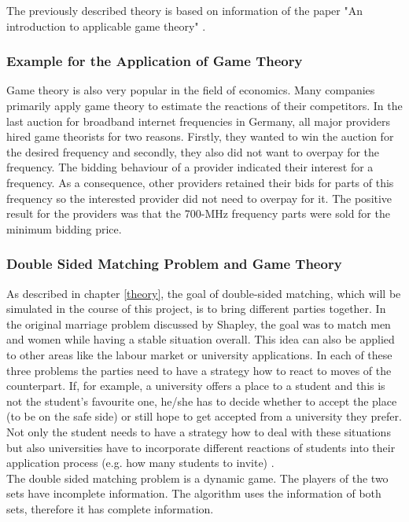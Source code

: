 The previously described theory is based on information of the paper "An introduction to applicable game theory" \cite {gibbons1997gametheory}.

\subsubsection{Example for the Application of Game Theory}
Game theory is also very popular in the field of economics.
Many companies primarily apply game theory to estimate the reactions of their competitors. 
In the last auction for broadband internet frequencies in Germany, all major providers hired game theorists for two reasons. 
Firstly, they wanted to win the auction for the desired frequency and secondly, they also did not want to overpay for the frequency.
The bidding behaviour of a provider indicated their interest for a frequency. 
As a consequence, other providers retained their bids for parts of this frequency so the interested provider did not need to overpay for it. 
The positive result for the providers was that the 700-MHz frequency parts were sold for the minimum bidding price. \cite{gametheoryWelt}

\subsubsection{Double Sided Matching Problem and Game Theory}

As described in chapter \ref{theory}, the goal of double-sided matching, which will be simulated in the course of this project, is to bring different parties together.
In the original marriage problem discussed by Shapley, the goal was to match men and women while having a stable situation overall.
This idea can also be applied to other areas like the labour market or university applications.
In each of these three problems the parties need to have a strategy how to react to moves of the counterpart.
If, for example, a university offers a place to a student and this is not the student's favourite one, he/she has to decide whether to accept the place (to be on the safe side) or still hope to get accepted from a university they prefer.
Not only the student needs to have a strategy how to deal with these situations but also universities have to incorporate different reactions of students into their application process (e.g. how many students to invite) \cite{gale62a}. \\
The double sided matching problem is a dynamic game.
The players of the two sets have incomplete information.
The algorithm uses the information of both sets, therefore it has complete information.

